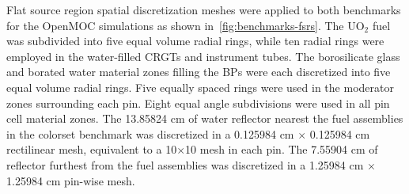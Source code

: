 
Flat source region spatial discretization meshes were applied to both benchmarks for the OpenMOC simulations as shown in~\autoref{fig:benchmarks-fsrs}. The UO$_2$ fuel was subdivided into five equal volume radial rings, while ten radial rings were employed in the water-filled CRGTs and instrument tubes. The borosilicate glass and borated water material zones filling the BPs were each discretized into five equal volume radial rings. Five equally spaced rings were used in the moderator zones surrounding each pin. Eight equal angle subdivisions were used in all pin cell material zones. The 13.85824 cm of water reflector nearest the fuel assemblies in the colorset benchmark was discretized in a 0.125984 cm $\times$ 0.125984 cm rectilinear mesh, equivalent to a 10$\times$10 mesh in each pin. The 7.55904 cm of reflector furthest from the fuel assemblies was discretized in a 1.25984 cm $\times$ 1.25984 cm pin-wise mesh.


